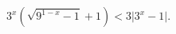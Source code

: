 \begin{ex}[type=inequality]
	\begin{condition}
		$ 3^x\left(\sqrt{9^{1-x} - 1} + 1\right)<3\big|3^x - 1\big| .$
	\end{condition}
\end{ex}
